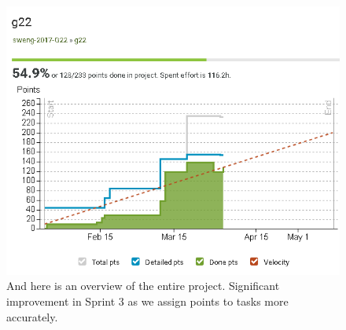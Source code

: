 \begin{figure}[H]
\centering
\caption{And here is an overview of the entire project. Significant improvement in Sprint 3 as we assign points to tasks more accurately.}
\includegraphics[width=\textwidth]{overview}
\end{figure}